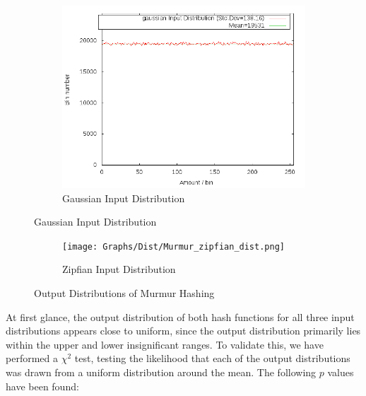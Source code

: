 \documentclass[11pt]{report} %
\begin{document}
\begin{multicols}{2}
\begin{minipage}{\columnwidth}
\begin{figure}[H]
\begin{subfigure}[b]{\textwidth}
        \includegraphics[width=\textwidth]{Graphs/Dist/Murmur_gaussian_dist.png}
        \caption{Gaussian Input Distribution}
        \label{fig:murmur_dist_gauss}
    \end{subfigure}
\end{figure}
\begin{figure}[H]\ContinuedFloat
    \centering
    \begin{subfigure}[b]{\textwidth}
        \texttt{[image: Graphs/Dist/Murmur\_zipfian\_dist.png]}
        \caption{Zipfian Input Distribution}
        \label{fig:murmur_dist_exp}
    \end{subfigure}
    \caption{Output Distributions of Murmur Hashing}\label{fig:murmur_dist}
\end{figure}
\noindent
\end{minipage}
\end{multicols}
\noindent
At first glance, the output distribution of both hash functions for all three input distributions appears close to uniform, since the output distribution primarily lies within the upper and lower insignificant ranges. To validate this, we have performed a $\chi^2$ test, testing the likelihood that each of the output distributions was drawn from a uniform distribution around the mean. The following $p$ values have been found:
\end{document}
